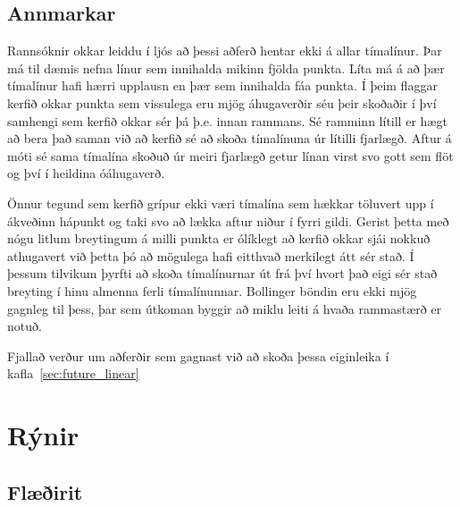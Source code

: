 \documentclass{article}
\begin{document}
\subsection{Annmarkar}

Rannsóknir okkar leiddu í ljós að þessi aðferð hentar ekki á allar tímalínur.
Þar má til dæmis nefna línur sem innihalda mikinn fjölda punkta.
Líta má á að þær tímalínur hafi \ilqq hærri\irqq \hspace{1pt} upplausn en þær sem innihalda fáa punkta. 
Í þeim flaggar kerfið okkar punkta sem vissulega eru mjög
áhugaverðir séu þeir skoðaðir í því samhengi sem kerfið okkar sér þá þ.e. innan
rammans. Sé ramminn lítill er hægt að bera það saman við að kerfið sé að skoða
tímalínuna úr lítilli fjarlægð. Aftur á móti sé sama tímalína skoðuð úr meiri
fjarlægð getur línan virst svo gott sem flöt og því í heildina óáhugaverð.

Önnur tegund sem kerfið grípur ekki væri tímalína sem hækkar töluvert upp í ákveðinn
hápunkt og taki svo að lækka aftur niður í fyrri gildi. Gerist þetta með nógu
litlum breytingum á milli punkta er ólíklegt að kerfið okkar sjái nokkuð
athugavert við þetta þó að mögulega hafi eitthvað merkilegt átt sér stað. 
Í þessum tilvikum þyrfti að skoða tímalínurnar út frá því hvort
það eigi sér stað breyting í hinu almenna ferli tímalínunnar. Bollinger böndin
eru ekki mjög gagnleg til þess, þar sem útkoman byggir að miklu leiti á hvaða
rammastærð er notuð. 

Fjallað verður um aðferðir sem gagnast við að skoða þessa eiginleika í kafla~\ref{sec:future_linear}


\newpage
\section{Rýnir}
\subsection{Flæðirit}
\label{sec:flow_chart}
\end{document}
